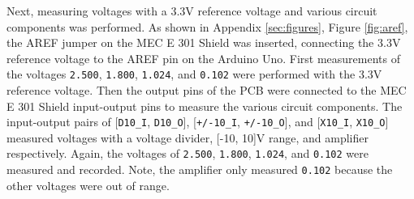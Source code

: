 Next, measuring voltages with a 3.3V reference voltage and various circuit components was performed. As shown in Appendix \ref{sec:figures}, Figure \ref{fig:aref},
the AREF jumper on the MEC E 301 Shield was inserted, connecting the 3.3V reference voltage to the AREF pin on the Arduino Uno. First measurements of the voltages \texttt{2.500}, 
\texttt{1.800}, \texttt{1.024}, and \texttt{0.102} were performed with the 3.3V reference voltage. Then the output pins of the PCB were connected to the MEC E 301 Shield input-output 
pins to measure the various circuit components. The input-output pairs of [\texttt{D10\_I}, \texttt{D10\_O}], [\texttt{+/-10\_I}, \texttt{+/-10\_O}], and [\texttt{X10\_I}, 
\texttt{X10\_O}] measured voltages with a voltage divider, [-10, 10]V range, and amplifier respectively. Again, the voltages of \texttt{2.500}, \texttt{1.800}, \texttt{1.024}, 
and \texttt{0.102} were measured and recorded. Note, the amplifier only measured \texttt{0.102} because the other voltages were out of range.




